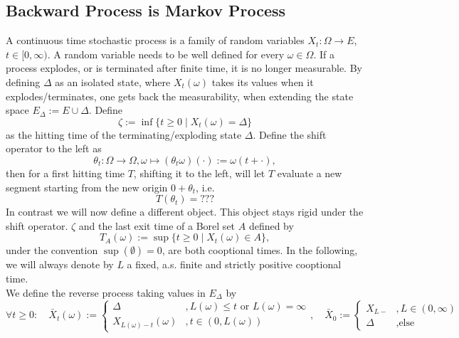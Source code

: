 \documentclass[a4paper,12pt,twoside]{article}
\begin{document}
\subsection{Backward Process is Markov Process}
A continuous time stochastic process is a family of random variables $X_t : \Omega \to E$, $t \in [0,\infty)$. A random variable needs to be well defined for every $\omega \in \Omega$. If a process explodes, or is terminated after finite time, it is no longer measurable. By defining $\Delta$ as an isolated state, where $X_t (\omega)$ takes its values when it explodes/terminates, one gets back the measurability, when extending the state space $E_\Delta := E \cup \Delta$. Define 
\[
\zeta := \inf \{ t \geq 0 \mid X_t (\omega)=\Delta \}
\]
as the hitting time of the terminating/exploding state $\Delta$. Define the shift operator to the left as 
\[
\theta_t : \Omega \to \Omega, \omega \mapsto (\theta_t \omega)(\cdot) := \omega (t+\cdot),
\]
then for a first hitting time $T$, shifting it to the left, will let $T$ evaluate a new segment starting from the new origin $0+\theta_t$, i.e. 
\[
T (\theta_t) = ???
\]
In contrast we will now define a different object.
This object stays rigid under the shift operator. $\zeta$ and the last exit time of a Borel set $A$ defined by 
\[
T_A (\omega) := \sup \{ t \geq 0 \mid X_t (\omega) \in A \}, 
\]
under the convention $\sup(\emptyset)=0$, are both cooptional times. 
In the following, we will always denote by $L$ a fixed, a.s. finite and strictly positive cooptional time. \\
We define the reverse process taking values in $E_\Delta$ by 
\[
\forall t \geq 0 : \quad \bar{X}_t (\omega) := \begin{cases}
    \Delta &, L(\omega) \leq t \text{ or } L(\omega) =\infty \\
    X_{L(\omega)-t} (\omega) &, t \in (0,L(\omega))
\end{cases}, \quad \bar{X}_0 := \begin{cases}
    X_{L-} &,L \in (0,\infty) \\
    \Delta &, \text{else}
\end{cases}
\]
\end{document}

